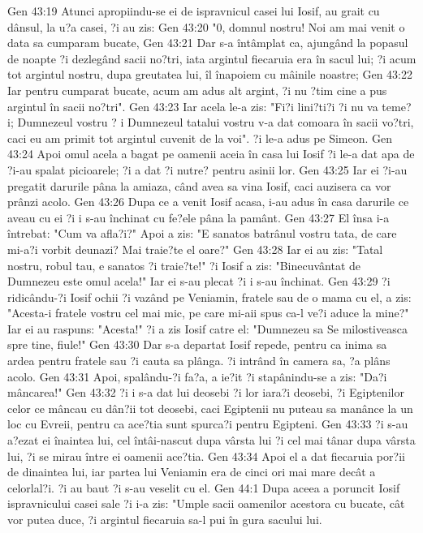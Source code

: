 Gen 43:19  Atunci apropiindu-se ei de ispravnicul casei lui Iosif, au grait cu dânsul, la u?a casei, ?i au zis:
Gen 43:20  "0, domnul nostru! Noi am mai venit o data sa cumparam bucate,
Gen 43:21  Dar s-a întâmplat ca, ajungând la popasul de noapte ?i dezlegând sacii no?tri, iata argintul fiecaruia era în sacul lui; ?i acum tot argintul nostru, dupa greutatea lui, îl înapoiem cu mâinile noastre;
Gen 43:22  Iar pentru cumparat bucate, acum am adus alt argint, ?i nu ?tim cine a pus argintul în sacii no?tri".
Gen 43:23  Iar acela le-a zis: "Fi?i lini?ti?i ?i nu va teme?i; Dumnezeul vostru ? i Dumnezeul tatalui vostru v-a dat comoara în sacii vo?tri, caci eu am primit tot argintul cuvenit de la voi". ?i le-a adus pe Simeon.
Gen 43:24  Apoi omul acela a bagat pe oamenii aceia în casa lui Iosif ?i le-a dat apa de ?i-au spalat picioarele; ?i a dat ?i nutre? pentru asinii lor.
Gen 43:25  Iar ei ?i-au pregatit darurile pâna la amiaza, când avea sa vina Iosif, caci auzisera ca vor prânzi acolo.
Gen 43:26  Dupa ce a venit Iosif acasa, i-au adus în casa darurile ce aveau cu ei ?i i s-au închinat cu fe?ele pâna la pamânt.
Gen 43:27  El însa i-a întrebat: "Cum va afla?i?" Apoi a zis: "E sanatos batrânul vostru tata, de care mi-a?i vorbit deunazi? Mai traie?te el oare?"
Gen 43:28  Iar ei au zis: "Tatal nostru, robul tau, e sanatos ?i traie?te!" ?i Iosif a zis: "Binecuvântat de Dumnezeu este omul acela!" Iar ei s-au plecat ?i i s-au închinat.
Gen 43:29  ?i ridicându-?i Iosif ochii ?i vazând pe Veniamin, fratele sau de o mama cu el, a zis: "Acesta-i fratele vostru cel mai mic, pe care mi-aii spus ca-l ve?i aduce la mine?" Iar ei au raspuns: "Acesta!" ?i a zis Iosif catre el: "Dumnezeu sa Se milostiveasca spre tine, fiule!"
Gen 43:30  Dar s-a departat Iosif repede, pentru ca inima sa ardea pentru fratele sau ?i cauta sa plânga. ?i intrând în camera sa, ?a plâns acolo.
Gen 43:31  Apoi, spalându-?i fa?a, a ie?it ?i stapânindu-se a zis: "Da?i mâncarea!"
Gen 43:32  ?i i s-a dat lui deosebi ?i lor iara?i deosebi, ?i Egiptenilor celor ce mâncau cu dân?ii tot deosebi, caci Egiptenii nu puteau sa manânce la un loc cu Evreii, pentru ca ace?tia sunt spurca?i pentru Egipteni.
Gen 43:33  ?i s-au a?ezat ei înaintea lui, cel întâi-nascut dupa vârsta lui ?i cel mai tânar dupa vârsta lui, ?i se mirau între ei oamenii ace?tia.
Gen 43:34  Apoi el a dat fiecaruia por?ii de dinaintea lui, iar partea lui Veniamin era de cinci ori mai mare decât a celorlal?i. ?i au baut ?i s-au veselit cu el.
Gen 44:1  Dupa aceea a poruncit Iosif ispravnicului casei sale ?i i-a zis: "Umple sacii oamenilor acestora cu bucate, cât vor putea duce, ?i argintul fiecaruia sa-l pui în gura sacului lui.
